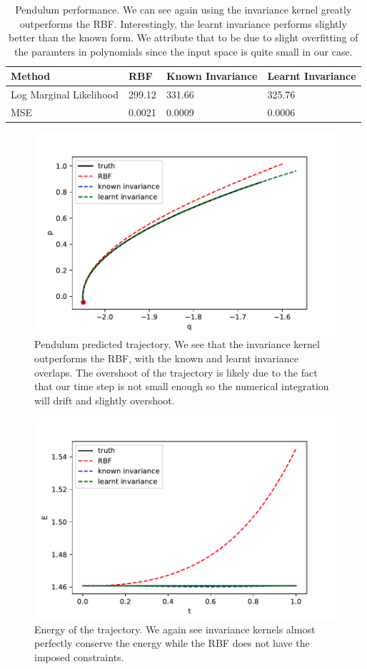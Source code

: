 \documentclass{statsmsc}
\begin{document}
\begin{table}[H]
  \centering
  \begin{tabular}{ l l l l}
    \hline
Method           & RBF & Known Invariance&  Learnt Invariance\\
                    \hline
Log Marginal Likelihood & 299.12 & 331.66 & 325.76 \\
MSE & 0.0021 & 0.0009 & 0.0006 \\
    \hline
  \end{tabular}
  \caption{Pendulum performance. We can see again using the invariance kernel greatly outperforms the RBF. Interestingly, the learnt invariance performs slightly better than the known form. We attribute that to be due to slight overfitting of the paramters in polynomials since the input space is quite small in our case.}
  \label{tab:pendulum_performance}
\end{table}

\begin{figure}[H]
        \centering
        \includegraphics[width=0.8\linewidth]{../codes/figures/pendulum_predicted.pdf}
        \caption{Pendulum predicted trajectory. We see that the invariance kernel outperforms the RBF, with the known and learnt invariance overlaps. The overshoot of the trajectory is likely due to the fact that our time step is not small enough so the numerical integration will drift and slightly overshoot.}
        \label{fig:pendulum_prediction}
\end{figure}

\begin{figure}[H] 
  \includegraphics[width=0.8\linewidth]{../codes/figures/pendulum_energy.pdf}
  \centering
  \caption{Energy of the trajectory. We again see invariance kernels almost perfectly conserve the energy while the RBF does not have the imposed constraints.}
  \label{fig:pendulum_energy}
\end{figure}
\end{document}
